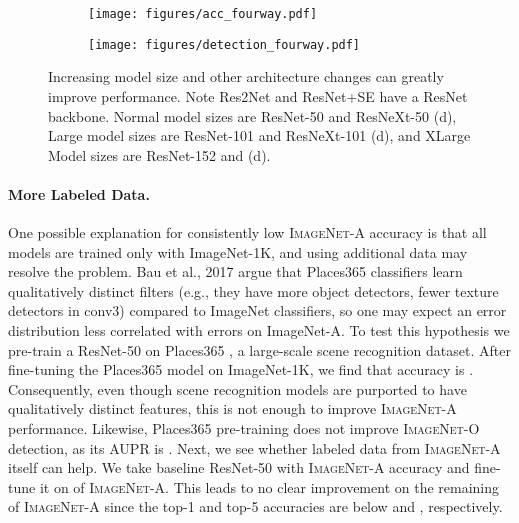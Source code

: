 \documentclass[10pt,twocolumn,letterpaper]{article}
\begin{document}
\begin{figure*}[t]
\vspace{-25pt}
\begin{subfigure}{.5\textwidth}
    \centering
    \texttt{[image: figures/acc\_fourway.pdf]}
\end{subfigure}\begin{subfigure}{.5\textwidth}
    \centering
    \texttt{[image: figures/detection\_fourway.pdf]}
\end{subfigure}\caption{Increasing model size and other architecture changes can greatly improve performance. Note Res2Net and ResNet+SE have a ResNet backbone. Normal model sizes are ResNet-50 and ResNeXt-50 (d), Large model sizes are ResNet-101 and ResNeXt-101 (d), and XLarge Model sizes are ResNet-152 and (d).}\label{fig:attn}
\vspace{-10pt}
\end{figure*}

\paragraph{More Labeled Data.}
One possible explanation for consistently low \textsc{ImageNet-A} accuracy is that all models are trained only with ImageNet-1K, and using additional data may resolve the problem. Bau et al., 2017 \cite{Bau2017NetworkDQ} argue that Places365 classifiers learn qualitatively distinct filters (e.g., they have more object detectors, fewer texture detectors in conv3) compared to ImageNet classifiers, so one may expect an error distribution less correlated with errors on ImageNet-A. To test this hypothesis we pre-train a ResNet-50 on Places365 \cite{zhou2017places}, a large-scale scene recognition dataset.
After fine-tuning the Places365 model on ImageNet-1K, we find that accuracy is . Consequently, even though scene recognition models are purported to have qualitatively distinct features, this is not enough to improve \textsc{ImageNet-A} performance. Likewise, Places365 pre-training does not improve \textsc{ImageNet-O} detection, as its AUPR is . Next, we see whether labeled data from \textsc{ImageNet-A} itself can help. We take baseline ResNet-50 with  \textsc{ImageNet-A} accuracy and fine-tune it on  of \textsc{ImageNet-A}. This leads to no clear improvement on the remaining  of \textsc{ImageNet-A} since the top-1 and top-5 accuracies are below  and , respectively.
\end{document}
